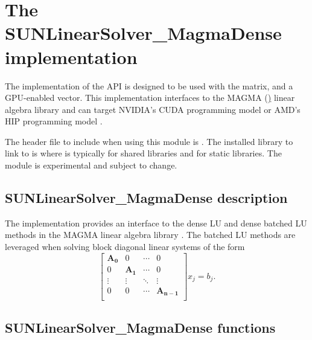 \section{The SUNLinearSolver\_MagmaDense implementation}\label{ss:sunlinsol_magmadense}

The  implementation of the {\sunlinsol} API is
designed to be used with the  matrix, and a
GPU-enabled vector. This implementation interfaces to the MAGMA
(\href{https://icl.utk.edu/magma/}) linear algebra library and can target
NVIDIA's CUDA programming model or AMD's HIP programming model \cite{magma_ref}.

The header file to include when using this module is
. The installed library to link to is
 where  is
typically  for shared libraries and  for static libraries.
\newline
\newline
{\warn}The  module is experimental and subject to change.

\subsection{SUNLinearSolver\_MagmaDense description}\label{ss:sunlinsol_magmadense_description}

The  implementation provides an interface to
the dense LU and dense batched LU methods in the MAGMA linear algebra library
\cite{magma_site}. The batched LU methods are leveraged when solving block diagonal
linear systems of the form
\begin{equation*}
  \begin{bmatrix}
    \mathbf{A_0} & 0 & \cdots & 0\\
    0 & \mathbf{A_1} & \cdots & 0\\
    \vdots & \vdots & \ddots & \vdots\\
    0 & 0 & \cdots & \mathbf{A_{n-1}}\\
  \end{bmatrix}
  x_j
  =
  b_j.
\end{equation*}


\subsection{SUNLinearSolver\_MagmaDense functions}\label{ss:sunlinsol_magmadense_functions}

